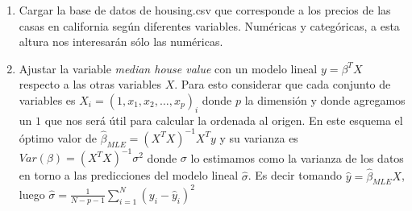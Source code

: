 \documentclass[12pt]{paper}
\begin{document}
\begin{enumerate}
\begin{enumerate}
\item Cargar la base de datos de housing.csv que corresponde a los precios de las casas en california según diferentes variables. Numéricas y categóricas, a esta altura nos interesarán sólo las numéricas.
\item Ajustar la variable \textit{median house value} con un modelo lineal $y = \beta^{T} X$ respecto a las otras variables $X$. Para esto considerar que cada conjunto de variables es $X_{i} = (1,x_{1},x_{2},\dots,x_{p})_{i}$ donde $p$ la dimensión y donde agregamos un $1$ que nos será útil para calcular la ordenada al origen. En este esquema el óptimo valor de $\hat{\beta}_{MLE} = (X^{T}X)^{-1}X^{T}y$ y su varianza es $Var(\beta) = (X^{T}X)^{-1} \sigma^{2}$ donde $\sigma$ lo estimamos como la varianza de los datos en torno a las predicciones del modelo lineal $\hat{\sigma}$. Es decir tomando $\hat{y} = \hat{\beta}_{MLE}X$, luego $\hat{\sigma}  = \frac{1}{N-p-1}\sum_{i = 1}^{N}(y_{i}-\hat{y}_{i})^{2}$

\end{enumerate}

\end{enumerate}

\pagestyle{empty}
\end{document}

